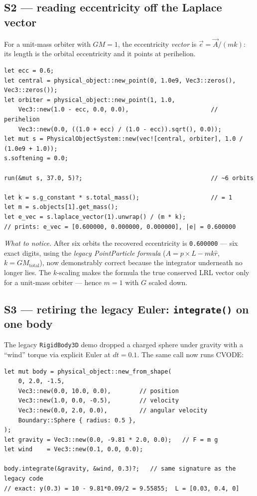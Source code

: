 \documentclass[11pt]{article}
\newcommand{\code}[1]{\texttt{#1}}
\begin{document}
\subsection{S2 --- reading eccentricity off the Laplace vector}

For a unit-mass orbiter with $GM = 1$, the eccentricity \emph{vector}
is $\vec e = \vec A/(mk)$: its length is the orbital eccentricity and
it points at perihelion.

\begin{lstlisting}[language=RustLite]
let ecc = 0.6;
let central = physical_object::new_point(0, 1.0e9, Vec3::zeros(), Vec3::zeros());
let orbiter = physical_object::new_point(1, 1.0,
    Vec3::new(1.0 - ecc, 0.0, 0.0),                       // perihelion
    Vec3::new(0.0, ((1.0 + ecc) / (1.0 - ecc)).sqrt(), 0.0));
let mut s = PhysicalObjectSystem::new(vec![central, orbiter], 1.0 / (1.0e9 + 1.0));
s.softening = 0.0;

run(&mut s, 37.0, 5)?;                                    // ~6 orbits

let k = s.g_constant * s.total_mass();                    // = 1
let m = s.objects[1].get_mass();
let e_vec = s.laplace_vector(1).unwrap() / (m * k);
// prints: e_vec = [0.600000, 0.000000, 0.000000], |e| = 0.600000
\end{lstlisting}

\emph{What to notice.} After six orbits the recovered eccentricity is
\code{0.600000} --- six exact digits, using the \emph{legacy
PointParticle formula} ($A = p\times L - mk\hat r$,
$k = G M_{\text{total}}$), now demonstrably correct because the
integrator underneath no longer lies. The $k$-scaling makes the formula
the true conserved LRL vector only for a unit-mass orbiter --- hence
$m=1$ with $G$ scaled down.

\subsection{S3 --- retiring the legacy Euler: \code{integrate()} on one body}

The legacy \code{RigidBody3D} demo dropped a charged sphere under
gravity with a ``wind'' torque via explicit Euler at $dt=0.1$. The same
call now runs CVODE:

\begin{lstlisting}[language=RustLite]
let mut body = physical_object::new_from_shape(
    0, 2.0, -1.5,
    Vec3::new(0.0, 10.0, 0.0),        // position
    Vec3::new(1.0, 0.0, -0.5),        // velocity
    Vec3::new(0.0, 2.0, 0.0),         // angular velocity
    Boundary::Sphere { radius: 0.5 },
);
let gravity = Vec3::new(0.0, -9.81 * 2.0, 0.0);   // F = m g
let wind    = Vec3::new(0.1, 0.0, 0.0);

body.integrate(&gravity, &wind, 0.3)?;   // same signature as the legacy code
// exact: y(0.3) = 10 - 9.81*0.09/2 = 9.55855;  L = [0.03, 0.4, 0]
\end{lstlisting}
\end{document}
